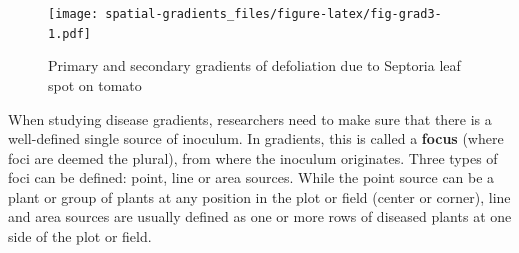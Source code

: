 \documentclass[
  letterpaper,
]{book}
\begin{document}
\begin{figure}

{\centering \texttt{[image: spatial-gradients\_files/figure-latex/fig-grad3-1.pdf]}

}

\caption{\label{fig-grad3}Primary and secondary gradients of defoliation
due to Septoria leaf spot on tomato}

\end{figure}

When studying disease gradients, researchers need to make sure that
there is a well-defined single source of inoculum. In gradients, this is
called a \textbf{focus} (where foci are deemed the plural), from where
the inoculum originates. Three types of foci can be defined: point, line
or area sources. While the point source can be a plant or group of
plants at any position in the plot or field (center or corner), line and
area sources are usually defined as one or more rows of diseased plants
at one side of the plot or field.
\end{document}
